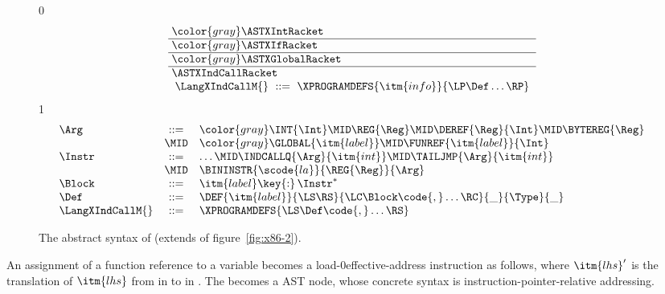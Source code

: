 \documentclass[7x10]{TimesAPriori_MIT}%
\newcommand{\gray}[1]{{\color{gray} #1}}
\def\racketEd{0}
\def\pythonEd{1}
\def\edition{1}
\def\xeightysixEd{0}
\def\architecture{1}
\newcommand\ifxeightsix[1]{\if\architecture\xeightysixEd{#1}\fi}
\newcommand{\pythonColor}[0]{}
\numberwithin{theorem}{chapter}
\numberwithin{definition}{chapter}
\numberwithin{equation}{chapter}
\begin{document}
\begin{figure}[tp]
  \begin{tcolorbox}[colback=white]
    \small
{\if\edition\racketEd
\[\arraycolsep=3pt
\begin{array}{l}
  \gray{\ASTXIntRacket} \\ \hline
  \gray{\ASTXIfRacket} \\ \hline
  \gray{\ASTXGlobalRacket} \\ \hline
  \ASTXIndCallRacket \\
\begin{array}{lcl}
\LangXIndCallM{} &::= & \XPROGRAMDEFS{\itm{info}}{\LP\Def\ldots\RP}
\end{array}
\end{array}
\]
\fi}
{\if\edition\pythonEd\pythonColor
\[
\begin{array}{lcl}
  \Arg &::=&  \gray{  \INT{\Int} \MID \REG{\Reg} \MID \DEREF{\Reg}{\Int}
     \MID \BYTEREG{\Reg} } \\
     &\MID& \gray{ \GLOBAL{\itm{label}} } \MID \FUNREF{\itm{label}}{\Int} \\
  \Instr &::=& \ldots \MID \INDCALLQ{\Arg}{\itm{int}}
    \MID \TAILJMP{\Arg}{\itm{int}}\\
    &\MID& \BININSTR{\scode{la}}{\REG{\Reg}}{\Arg}\\
  \Block &::=&\itm{label}\key{:}\,\Instr^{*} \\
  \Def &::= & \DEF{\itm{label}}{\LS\RS}{\LC\Block\code{,}\ldots\RC}{\_}{\Type}{\_} \\
\LangXIndCallM{} &::= & \XPROGRAMDEFS{\LS\Def\code{,}\ldots\RS}
\end{array}
\]
\fi}
  \end{tcolorbox}
\caption{The abstract syntax of \LangXIndCall{} (extends
  \LangXGlobal{} of figure~\ref{fig:x86-2}).}
\label{fig:x86-3}
\end{figure}

An assignment of a function reference to a variable becomes a
load-\ifxeightsix{effective-}address instruction as follows, where $\itm{lhs}'$ is
the translation of $\itm{lhs}$ from \Atm{} in \LangCFun{} to \Arg{} in
\LangXIndCallVar{}. The  becomes a  AST
node, whose concrete syntax is instruction-pointer-relative
addressing.
\end{document}
